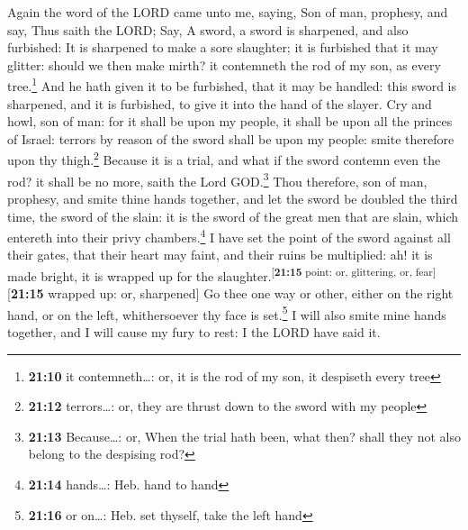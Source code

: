  Again the word of the LORD came unto me, saying,
 Son of man, prophesy, and say, Thus saith the LORD; Say,
A sword, a sword is sharpened, and also furbished:  It is
sharpened to make a sore slaughter; it is furbished that it may glitter:
should we then make mirth? it contemneth the rod of my son, as every
tree.\footnote{\textbf{21:10} it contemneth\ldots: or, it is the rod of
  my son, it despiseth every tree}  And he hath given it
to be furbished, that it may be handled: this sword is sharpened, and it
is furbished, to give it into the hand of the slayer. 
Cry and howl, son of man: for it shall be upon my people, it shall be
upon all the princes of Israel: terrors by reason of the sword shall be
upon my people: smite therefore upon thy thigh.\footnote{\textbf{21:12}
  terrors\ldots: or, they are thrust down to the sword with my people}
 Because it is a trial, and what if the sword contemn
even the rod? it shall be no more, saith the Lord GOD.\footnote{\textbf{21:13}
  Because\ldots: or, When the trial hath been, what then? shall they not
  also belong to the despising rod?}  Thou therefore, son
of man, prophesy, and smite thine hands together, and let the sword be
doubled the third time, the sword of the slain: it is the sword of the
great men that are slain, which entereth into their privy
chambers.\footnote{\textbf{21:14} hands\ldots: Heb. hand to hand}
 I have set the point of the sword against all their
gates, that their heart may faint, and their ruins be multiplied: ah! it
is made bright, it is wrapped up for the
slaughter.\textsuperscript{{[}\textbf{21:15} point: or, glittering, or,
fear{]}}{[}\textbf{21:15} wrapped up: or, sharpened{]} 
Go thee one way or other, either on the right hand, or on the left,
whithersoever thy face is set.\footnote{\textbf{21:16} or on\ldots: Heb.
  set thyself, take the left hand}  I will also smite
mine hands together, and I will cause my fury to rest: I the LORD have
said it.

